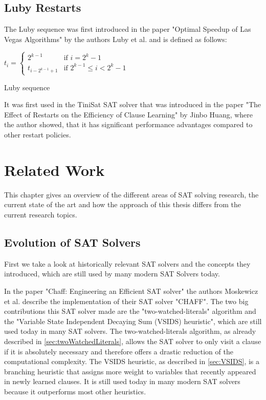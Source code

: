 \section{Luby Restarts}

The Luby sequence was first introduced in the paper "Optimal Speedup of Las Vegas Algorithms" \cite{luby1993optimal} by the authors Luby et al. and is defined as follows:

\begin{definition}
\centering
\begin{leftbar}
$t_i =
\begin{cases}
  2^{k-1} & \text{if } i = 2^k - 1   \\
  t_{i-2^{k-1}+1} & \text{if } 2^{k-1} \leq i < 2^k - 1
\end{cases}$
\end{leftbar}
\caption{Luby sequence \cite{luby1993optimal}}
\end{definition}

It was first used in the TiniSat SAT solver that was introduced in the paper "The Effect of Restarts on the Efficiency of Clause Learning" \cite{huang2007effect} by Jinbo Huang, where the author showed, that it has significant performance advantages compared to other restart policies.

\chapter{Related Work}
\label{ch:Related Work}

This chapter gives an overview of the different areas of SAT solving research, the current state of the art and how the approach of this thesis differs from the current research topics.

\section{Evolution of SAT Solvers}
First we take a look at historically relevant SAT solvers and the concepts they introduced, which are still used by many modern SAT Solvers today.

In the paper "Chaff: Engineering an Efficient SAT solver" \cite{moskewicz2001chaff} the authors Moskewicz et al. describe the implementation of their SAT solver "CHAFF". The two big contributions this SAT solver made are the "two-watched-literals" algorithm and the "Variable State Independent Decaying Sum (VSIDS) heuristic", which are still used today in many SAT solvers. The two-watched-literals algorithm, as already described in \ref{sec:twoWatchedLiterals}, allows the SAT solver to only visit a clause if it is absolutely necessary and therefore offers a drastic reduction of the computational complexity. The VSIDS heuristic, as described in \ref{sec:VSIDS}, is a branching heuristic that assigns more weight to variables that recently appeared in newly learned clauses. It is still used today in many modern SAT solvers because it outperforms most other heuristics.

